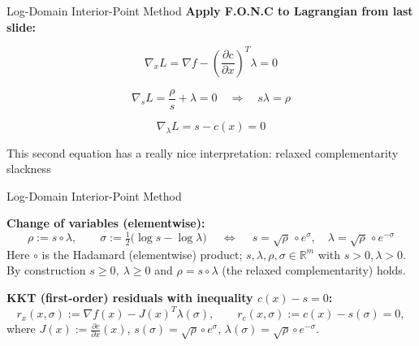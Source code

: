 \begin{frame}{Log-Domain Interior-Point Method}
\textbf{Apply F.O.N.C to Lagrangian from last slide:}

$$
\nabla_x L = \nabla f - \left(\frac{\partial c}{\partial x}\right)^T \lambda = 0
$$

$$
\nabla_s L = \frac{\rho}{s} + \lambda = 0 \quad \Rightarrow \quad s \lambda = \rho
$$

$$
\nabla_\lambda L = s - c(x) = 0
$$

This second equation has a really nice interpretation: relaxed complementarity slackness


\end{frame}





\begin{frame}{Log-Domain Interior-Point Method}

\textbf{Change of variables (elementwise):}
\[
\boxed{\ \rho := s \circ \lambda,\qquad 
\sigma := \tfrac{1}{2}\big(\log s - \log \lambda\big)\ }
\quad\Longleftrightarrow\quad
\boxed{\ s = \sqrt{\rho}\, \circ e^{\sigma},\quad 
\lambda = \sqrt{\rho}\, \circ e^{-\sigma}\ }
\]
{\footnotesize
Here \(\circ\) is the Hadamard (elementwise) product; \(s,\lambda,\rho,\sigma\in\mathbb{R}^m\) with \(s>0,\lambda>0\).
By construction \(s\ge 0,\ \lambda\ge 0\) and \(\rho = s\circ\lambda\) (the relaxed complementarity) holds.}

\vspace{0.6em}

\textbf{KKT (first-order) residuals with inequality \(c(x) - s = 0\):}
\[
r_x(x,\sigma) := \nabla f(x) - J(x)^{\!T}\lambda(\sigma), 
\qquad
r_c(x,\sigma) := c(x) - s(\sigma) = 0,
\]
where \(J(x) := \frac{\partial c}{\partial x}(x)\), 
\(s(\sigma)=\sqrt{\rho}\circ e^{\sigma}\), 
\(\lambda(\sigma)=\sqrt{\rho}\circ e^{-\sigma}\).

\end{frame}

